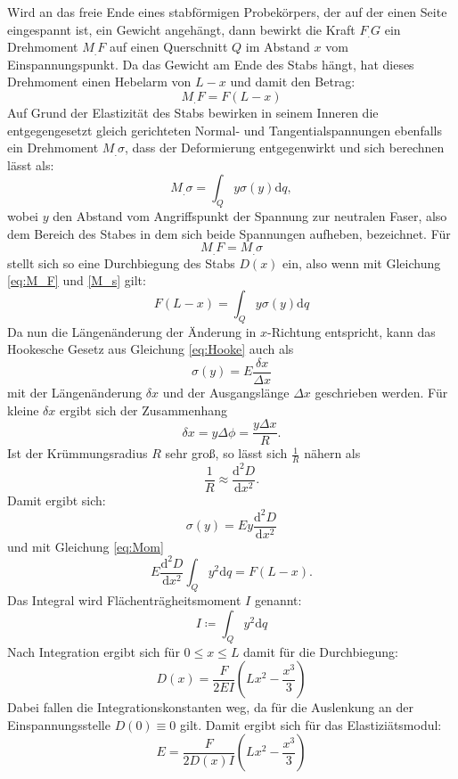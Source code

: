 Wird an das freie Ende eines stabförmigen Probekörpers, der auf der einen Seite eingespannt ist, ein Gewicht angehängt, dann bewirkt die Kraft $F_.G$ ein Drehmoment $M_.F$ auf einen Querschnitt $Q$ im Abstand $x$ vom Einspannungspunkt.
Da das Gewicht am Ende des Stabs hängt, hat dieses Drehmoment einen Hebelarm von $L-x$ und damit den Betrag:
\begin{equation}
M_.F = F(L-x) \label{eq:M_F}
\end{equation}
Auf Grund der Elastizität des Stabs bewirken in seinem Inneren die entgegengesetzt gleich gerichteten Normal- und Tangentialspannungen ebenfalls ein Drehmoment $M_.{\sigma}$, dass der Deformierung entgegenwirkt und sich berechnen lässt als:
\begin{equation}
M_.{\sigma} = \int_Q y \sigma (y) \mathrm{d}q, \label{M_s}
\end{equation}
wobei $y$ den Abstand vom Angriffspunkt der Spannung zur neutralen Faser, also dem Bereich des Stabes in dem sich beide Spannungen aufheben, bezeichnet.
Für
\begin{equation*}
M_.F = M_.{\sigma}
\end{equation*}
stellt sich so eine Durchbiegung des Stabs $D(x)$ ein, also wenn mit Gleichung \eqref{eq:M_F} und \eqref{M_s} gilt:
\begin{equation}
F(L-x) = \int_Q y \sigma (y) \mathrm{d}q \label{eq:Mom}
\end{equation}
Da nun die Längenänderung der Änderung in $x$-Richtung entspricht, kann das Hookesche Gesetz aus Gleichung \eqref{eq:Hooke} auch als 
\[
\sigma (y) = E \frac{\delta x}{\Delta x} 
\]
mit der Längenänderung $\delta x$ und der Ausgangslänge $\Delta x$ geschrieben werden.
Für kleine $\delta x$ ergibt sich der Zusammenhang 
\[
\delta x = y \Delta\phi = \frac{y\Delta x}{R} \text{.}
\]
Ist der Krümmungsradius $R$ sehr groß, so lässt sich $\frac{1}{R}$ nähern als
\[
\frac{1}{R}\approx \frac{\mathrm{d}^2D}{\mathrm{d}x^2}\text{.}
\]
Damit ergibt sich:
\[
\sigma (y) = E y \frac{\mathrm{d}^2D}{\mathrm{d}x^2}
\]
und mit Gleichung \eqref{eq:Mom}
\begin{equation}
E \frac{\mathrm{d}^2D}{\mathrm{d}x^2} \int_Q y^2 \mathrm{d}q = F(L-x)\text{.} \label{eq:Mom2}
\end{equation}
Das Integral wird Flächenträgheitsmoment $I$ genannt:
\begin{equation}
I \coloneqq \int_Q y^2 \mathrm{d}q \label{eq:I}
\end{equation}
Nach Integration ergibt sich für $0 \leq x \leq L$  damit für die Durchbiegung:
\begin{equation*}
D(x) = \frac{F}{2 E I}\left(L x^2 -\frac{x^3}{3}\right)
\end{equation*}
Dabei fallen die Integrationskonstanten weg, da für die Auslenkung an der Einspannungsstelle $D(0) \equiv 0$ gilt.
Damit ergibt sich für das Elastiziätsmodul:
\begin{equation}
E = \frac{F}{2 D(x) I}\left(L x^2 -\frac{x^3}{3}\right)\label{eq:E}
\end{equation}

